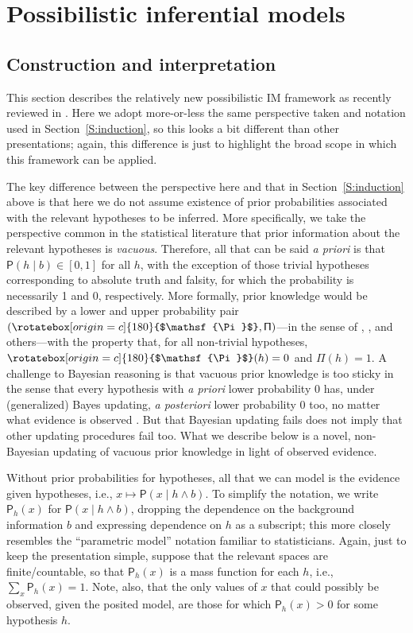 \documentclass[a4paper, 12pt]{article}
\theoremstyle{plain}
\theoremstyle{definition}
\theoremstyle{remark}
\newcommand{\prob}{\mathsf{P}}
\newcommand{\lPi}{\rotatebox[origin=c]{180}{$\mathsf{\Pi}$}} %
\newcommand{\uPi}{\mathsf{\Pi}}%
\begin{document}
\section{Possibilistic inferential models}
\label{S:im}

\subsection{Construction and interpretation}

This section describes the relatively new possibilistic IM framework as recently reviewed in \citet{imreview}.  Here we adopt more-or-less the same perspective taken and notation used in Section~\ref{S:induction}, so this looks a bit different than other presentations; again, this difference is just to highlight the broad scope in which this framework can be applied.  

The key difference between the perspective here and that in Section~\ref{S:induction} above is that here we do not assume existence of prior probabilities associated with the relevant hypotheses to be inferred.  More specifically, we take the perspective common in the statistical literature that prior information about the relevant hypotheses is {\em vacuous}.  Therefore, all that can be said {\em a priori} is that $\prob(h \mid b) \in [0,1]$ for all $h$, with the exception of those trivial hypotheses corresponding to absolute truth and falsity, for which the probability is necessarily 1 and 0, respectively.  More formally, prior knowledge would be described by a lower and upper probability pair $(\lPi, \uPi)$---in the sense of \citet{walley1991}, \citet{levi1980}, and others---with the property that, for all non-trivial hypotheses, $\lPi(h) = 0$ and $\uPi(h) = 1$. A challenge to Bayesian reasoning is that vacuous prior knowledge is too sticky in the sense that every hypothesis with {\em a priori} lower probability 0 has, under (generalized) Bayes updating, {\em a posteriori} lower probability 0 too, no matter what evidence is observed \citep[e.g.,][]{kyburg1987, gong.meng.update}.  But that Bayesian updating fails does not imply that other updating procedures fail too.  What we describe below is a novel, non-Bayesian updating of vacuous prior knowledge in light of observed evidence.  

Without prior probabilities for hypotheses, all that we can model is the evidence given hypotheses, i.e., $x \mapsto \prob(x \mid h \land b)$.  To simplify the notation, we write $\prob_h(x)$ for $\prob(x \mid h \land b)$, dropping the dependence on the background information $b$ and expressing dependence on $h$ as a subscript; this more closely resembles the ``parametric model'' notation familiar to statisticians.  Again, just to keep the presentation simple, suppose that the relevant spaces are finite/countable, so that $\prob_h(x)$ is a mass function for each $h$, i.e., $\sum_x \prob_h(x) = 1$.  Note, also, that the only values of $x$ that could possibly be observed, given the posited model, are those for which $\prob_h(x) > 0$ for some hypothesis $h$. 
\end{document}

